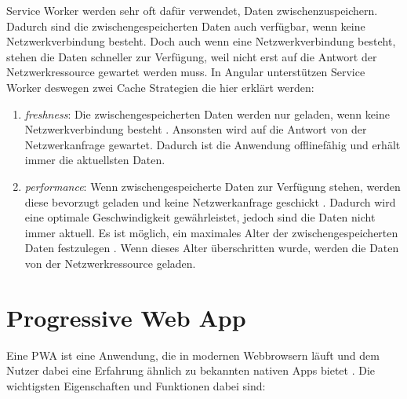 
Service Worker werden sehr oft dafür verwendet, Daten zwischenzuspeichern. Dadurch sind die zwischengespeicherten Daten auch verfügbar, wenn keine Netzwerkverbindung besteht. Doch auch wenn eine Netzwerkverbindung besteht, stehen die Daten schneller zur Verfügung, weil nicht erst auf die Antwort der Netzwerkressource gewartet werden muss. In Angular unterstützen Service Worker deswegen zwei Cache Strategien die hier erklärt werden:

\begin{enumerate}
\item \textit{freshness}: Die zwischengespeicherten Daten werden nur geladen, wenn keine Netzwerkverbindung besteht \autocite{angular-service-worker}. Ansonsten wird auf die Antwort von der Netzwerkanfrage gewartet. Dadurch ist die Anwendung offlinefähig und erhält immer die aktuellsten Daten.
\item \textit{performance}: Wenn zwischengespeicherte Daten zur Verfügung stehen, werden diese bevorzugt geladen und keine Netzwerkanfrage geschickt \autocite{angular-service-worker}. Dadurch wird eine optimale Geschwindigkeit gewährleistet, jedoch sind die Daten nicht immer aktuell. Es ist möglich, ein maximales Alter der zwischengespeicherten Daten festzulegen \autocite{angular-service-worker}. Wenn dieses Alter überschritten wurde, werden die Daten von der Netzwerkressource geladen.
\end{enumerate}

\section{Progressive Web App}
Eine \ac{PWA} ist eine Anwendung, die in modernen Webbrowsern läuft und dem Nutzer dabei eine Erfahrung ähnlich zu bekannten nativen Apps bietet \autocite{Sheppard2017} \autocite{Rojas2020}. Die wichtigsten Eigenschaften und Funktionen dabei sind:

